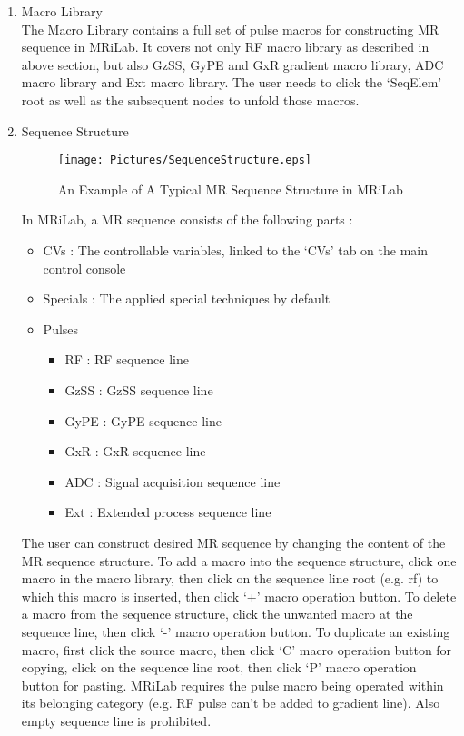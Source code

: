 \documentclass{book}%
\begin{document}
\begin{enumerate}
	\item Macro Library \\
	
	The Macro Library contains a full set of pulse macros for constructing MR sequence in MRiLab. It covers not only RF macro library as described in above section, but also GzSS, GyPE and GxR gradient macro library, ADC macro library and Ext macro library. The user needs to click the `SeqElem' root as well as the subsequent nodes to unfold those macros.
	
	\item Sequence Structure \\
	
\begin{figure}[htbp]
	\centering
		\texttt{[image: Pictures/SequenceStructure.eps]}
	\caption{An Example of A Typical MR Sequence Structure in MRiLab}
	\label{fig:SequenceStructure}
\end{figure}
	
	
In MRiLab, a MR sequence consists of the following parts :

\begin{itemize}
	\item CVs : The controllable variables, linked to the `CVs' tab on the main control console
	\item Specials : The applied special techniques by default
	\item Pulses
	\begin{itemize}
		\item RF : RF sequence line
		\item GzSS : GzSS sequence line
		\item GyPE : GyPE sequence line
		\item GxR : GxR sequence line
		\item ADC : Signal acquisition sequence line
		\item Ext : Extended process sequence line
	\end{itemize}
\end{itemize}

The user can construct desired MR sequence by changing the content of the MR sequence structure. To add a macro into the sequence structure, click one macro in the macro library, then click on the sequence line root (e.g. rf) to which this macro is inserted, then click `+' macro operation button. To delete a macro from the sequence structure, click the unwanted macro at the sequence line, then click `-' macro operation button. To duplicate an existing macro, first click the source macro, then click `C' macro operation button for copying, click on the sequence line root, then click `P' macro operation button for pasting. MRiLab requires the pulse macro being operated within its belonging category (e.g. RF pulse can't be added to gradient line). Also empty sequence line is prohibited.\\


\end{enumerate}
\end{document}
